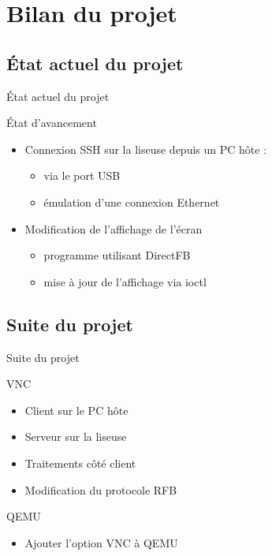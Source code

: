 \section[Bilan]{Bilan du projet}
\subsection[État actuel]{État actuel du projet}
\begin{frame}{État actuel du projet}

\begin{block}{État d'avancement}

	\begin{itemize}
		\item Connexion SSH sur la liseuse depuis un PC hôte :
		\begin{itemize}
			\item via le port USB
			\item émulation d'une connexion Ethernet
		\end{itemize}
		\item Modification de l'affichage de l'écran
		\begin{itemize}
			\item programme utilisant DirectFB
			\item mise à jour de l'affichage via ioctl
		\end{itemize}
	\end{itemize}

\end{block}

\end{frame}

\subsection[Suite]{Suite du projet}
\begin{frame}{Suite du projet}

\begin{block}{VNC}
	\begin{itemize}
		\item Client sur le PC hôte
		\item Serveur sur la liseuse
		\item Traitements côté client
		\item Modification du protocole RFB
	\end{itemize}
\end{block}

\begin{block}{QEMU}
	\begin{itemize}
		\item Ajouter l'option VNC à QEMU
	\end{itemize}
\end{block}

\end{frame}